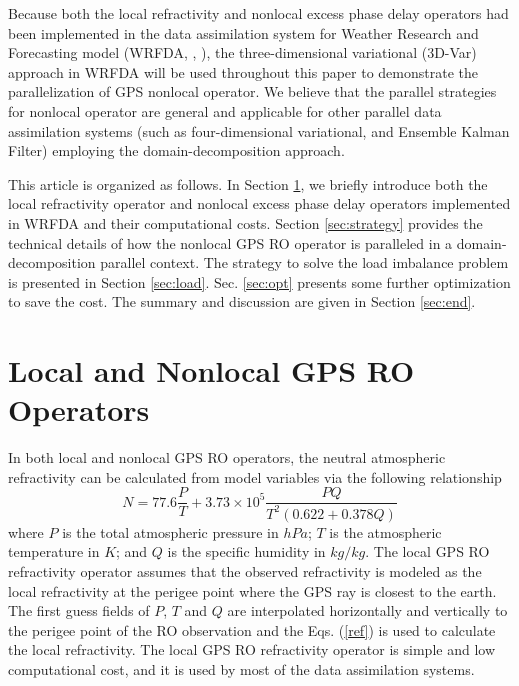 \documentclass[12pt]{article}
\begin{document}
Because both the local refractivity and nonlocal excess phase delay operators had been implemented in the data assimilation system for Weather Research and Forecasting model (WRFDA, \cite{Barker2012}, \cite{ChenSY2009}), the three-dimensional variational (3D-Var) approach in WRFDA will be used throughout this paper to demonstrate the parallelization of GPS nonlocal operator. We believe that the parallel strategies for nonlocal operator are general and applicable for other parallel data assimilation systems (such as four-dimensional variational, and Ensemble Kalman Filter) employing the domain-decomposition approach.

This article is organized as follows. In Section \ref{sec:operators}, we briefly introduce both the local refractivity operator and nonlocal excess phase delay operators implemented in WRFDA and their computational costs. Section \ref{sec:strategy} provides the technical details of how the nonlocal GPS RO operator is paralleled in a domain-decomposition parallel context. The strategy to solve the load imbalance problem is presented in Section \ref{sec:load}. Sec. \ref{sec:opt} presents some further optimization to save the cost. The summary and discussion are given in Section \ref{sec:end}.
\section{Local and Nonlocal GPS RO Operators}
\label{sec:operators}
In both local and nonlocal GPS RO operators, the neutral atmospheric refractivity can be calculated from model variables via the following relationship
\begin{equation}
\label{ref}
N = 77.6\frac{P}{T} + 3.73\times10^5\frac{P Q}{T^2(0.622+0.378Q)}
\end{equation}
where $P$ is the total atmospheric pressure in $hPa$; $T$ is the atmospheric temperature in $K$; and $Q$ is the specific humidity in ${kg}/{kg}$. The local GPS RO refractivity operator assumes that the observed refractivity is modeled as the local refractivity at the perigee point where the GPS ray is closest to the earth. The first guess fields of $P$, $T$ and $Q$ are interpolated horizontally and vertically to the perigee point of the RO observation and the Eqs. (\ref{ref}) is used to calculate the local refractivity. The local GPS RO refractivity operator is simple and low computational cost, and it is used by most of the data assimilation systems. 
\end{document}
